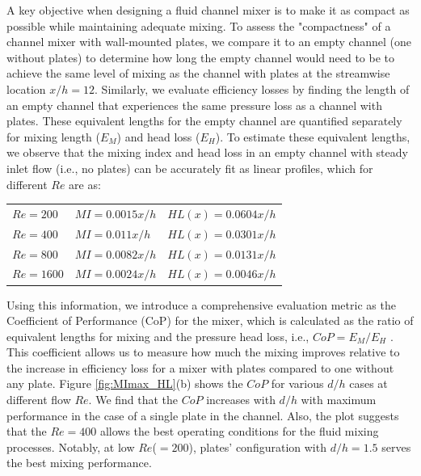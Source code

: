 \documentclass[reprint,a4paper,fleqn]{cas-dc} %
\providecommand{\DIFadd}[1]{{\protect\color{blue}\uwave{#1}}} %
\providecommand{\DIFaddFL}[1]{\DIFadd{#1}} %
\providecommand{\DIFaddbeginFL}{} %
\providecommand{\DIFaddendFL}{} %
\begin{document}
		A key objective when designing a fluid channel mixer is to make it as compact as possible while maintaining adequate mixing. To assess the "compactness" of a channel mixer with wall-mounted plates, we compare it to an empty channel (one without plates) to determine how long the empty channel would need to be to achieve the same level of mixing as the channel with plates at the streamwise location $x/h = 12$. Similarly, we evaluate efficiency losses by finding the length of an empty channel that experiences the same pressure loss as a channel with plates. These equivalent lengths for the empty channel are quantified separately for mixing length ($E_M$) and head loss ($E_H$). To estimate these equivalent lengths, we observe that the mixing index and head loss in an empty channel with steady inlet flow (i.e., no plates) can be accurately fit as linear profiles, which for different $Re$ are as:
		\begin{table}[width=0.8\linewidth,cols=3,pos=h]
			\begin{tabular*}{\tblwidth}{@{} LLL@{} }
				$Re = 200$\DIFaddbeginFL \DIFaddFL{~~~: }\DIFaddendFL &  $MI = 0.0015x/h$&  \DIFaddbeginFL \DIFaddFL{~~;~ }\DIFaddendFL $HL(x) = 0.0604x/h$ \\
				$Re = 400$\DIFaddbeginFL \DIFaddFL{~~~: }\DIFaddendFL &   $MI = 0.011x/h$&  \DIFaddbeginFL \DIFaddFL{~~;~ }\DIFaddendFL $HL(x) = 0.0301x/h$ \\
				$Re = 800$\DIFaddbeginFL \DIFaddFL{~~~: }\DIFaddendFL &   $MI = 0.0082x/h$& \DIFaddbeginFL \DIFaddFL{~~;~ }\DIFaddendFL $HL(x) = 0.0131x/h$ \\
				$Re = 1600$\DIFaddbeginFL \DIFaddFL{~:~ }\DIFaddendFL &  $MI = 0.0024x/h$& \DIFaddbeginFL \DIFaddFL{~~;~ }\DIFaddendFL $HL(x) = 0.0046x/h$  \\
			\end{tabular*}
		\end{table}

		Using this information, we introduce a comprehensive evaluation metric as the Coefficient of Performance (CoP) for the mixer, which is calculated as the ratio of equivalent lengths for mixing and the pressure head loss, i.e., $CoP = E_M/E_H$ \citep{Aaron2019, Self2024}. This coefficient allows us to measure how much the mixing improves relative to the increase in efficiency loss for a mixer with plates compared to one without any plate. Figure \ref{fig:MImax_HL}(b) shows the $CoP$ for various $d/h$ cases at different flow $Re$. We find that the $CoP$ increases with $d/h$ with maximum performance in the case of a single plate in the channel. Also, the plot suggests that the $Re=400$ allows the best operating conditions for the fluid mixing processes. Notably, at low $Re$($=200$), plates' configuration with $d/h=1.5$ serves the best mixing performance.
\end{document}
